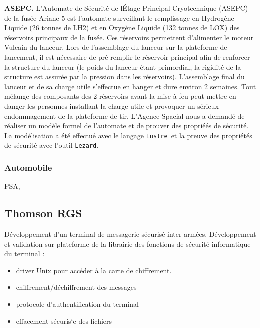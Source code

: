 \documentclass[a4paper,12pt]{article}
\newcommand{\Lustre}{{\tt Lustre}}
\newcommand{\Lezard}{{\tt Lezard}}
\newcommand{\smallspace}{\vspace{0.25cm}}
\begin{document}
\smallspace
\textbf{ASEPC.} L'Automate de S\'ecurit\'e de l\'Etage Principal
Cryotechnique (ASEPC) de la fus\'ee Ariane 5 est l'automate
surveillant le remplissage en Hydrog\`ene Liquide (26 tonnes de LH2)
et en Oxyg\`ene Liquide (132 tonnes de LOX) des r\'eservoirs
principaux de la fus\'ee. Ces r\'eservoirs permettent d'alimenter le
moteur Vulcain du lanceur.  Lors de l'assemblage du lanceur sur la
plateforme de lancement, il est n\'ecessaire de pr\'e-remplir le
r\'eservoir principal afin de renforcer la structure du lanceur (le
poids du lanceur \'etant primordial, la rigidit\'e de la structure est
assur\'ee par la pression dans les r\'eservoirs). L'assemblage final
du lanceur et de sa charge utile s'effectue en hanger et dure environ
2 semaines.  Tout m\'elange des composants des 2 r\'eservoirs avant la
mise à feu peut mettre en danger les personnes installant la charge
utile et provoquer un s\'erieux endommagement de la plateforme de
tir. L'Agence Spacial nous a demand\'e de r\'ealiser un mod\`ele
formel de l'automate et de prouver des propri\'e\'es de s\'ecurit\'e.
La mod\'elisation a \'et\'e effectu\'e avec le langage \Lustre\ et la
preuve des propri\'et\'es de s\'ecurit\'e avec l'outil \Lezard.

\subsubsection{Automobile}
PSA, 

\subsection{Thomson RGS}
D\'eveloppement d'un terminal de messagerie s\'ecuris\'e
inter-arm\'ees. D\'eveloppement et validation sur plateforme de la
librairie des fonctions de s\'ecurit\'e informatique du terminal :
\begin{itemize}
  \item driver Unix pour acc\'eder \`a la carte de chiffrement.
  \item chiffrement/d\'echiffrement des messages
  \item protocole d'authentification du terminal
  \item effacement s\'ecuris`e des fichiers
\end{itemize}

\newpage


\end{document}
